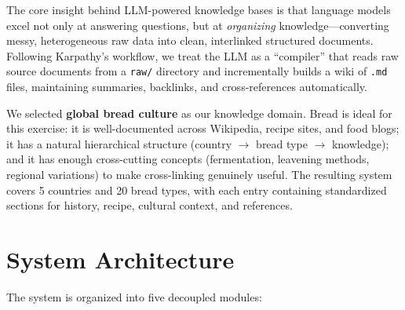 \documentclass[10.5pt,a4paper]{article}
\begin{document}
The core insight behind LLM-powered knowledge bases is that language models excel not only at answering questions, but at \textit{organizing} knowledge---converting messy, heterogeneous raw data into clean, interlinked structured documents. Following Karpathy's workflow, we treat the LLM as a ``compiler'' that reads raw source documents from a \texttt{raw/} directory and incrementally builds a wiki of \texttt{.md} files, maintaining summaries, backlinks, and cross-references automatically.

We selected \textbf{global bread culture} as our knowledge domain. Bread is ideal for this exercise: it is well-documented across Wikipedia, recipe sites, and food blogs; it has a natural hierarchical structure (country $\rightarrow$ bread type $\rightarrow$ knowledge); and it has enough cross-cutting concepts (fermentation, leavening methods, regional variations) to make cross-linking genuinely useful. The resulting system covers 5 countries and 20 bread types, with each entry containing standardized sections for history, recipe, cultural context, and references.

\section{System Architecture}

The system is organized into five decoupled modules:

\vspace{3pt}
\end{document}
